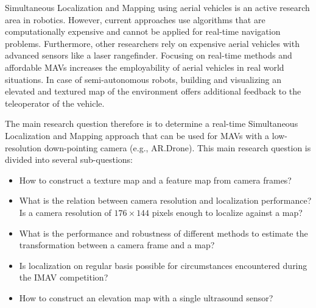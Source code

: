 Simultaneous Localization and Mapping using aerial vehicles is an active research area in robotics.
However, current approaches use algorithms that are computationally expensive and cannot be applied for real-time navigation problems.
Furthermore, other researchers rely on expensive aerial vehicles
with advanced sensors like a laser rangefinder.
Focusing on real-time methods and affordable MAVs increases the employability of aerial vehicles in real world situations.
In case of semi-autonomous robots, building and visualizing an elevated and textured map of the environment offers additional feedback to the teleoperator of the vehicle.

The main research question therefore is to determine a real-time Simultaneous Localization and Mapping approach that can be used for MAVs with a low-resolution down-pointing camera (e.g., AR.Drone).
This main research question is divided into several sub-questions:
\begin{itemize}
\item How to construct a texture map and a feature map from camera frames?
\item What is the relation between camera resolution and localization performance? Is a camera resolution of $176 \times 144$ pixels enough to localize against a map?
\item What is the performance and robustness of different methods to estimate the transformation between a camera frame and a map?
\item Is localization on regular basis possible for circumstances encountered during the IMAV competition?
\item How to construct an elevation map with a single ultrasound sensor?
\end{itemize}

